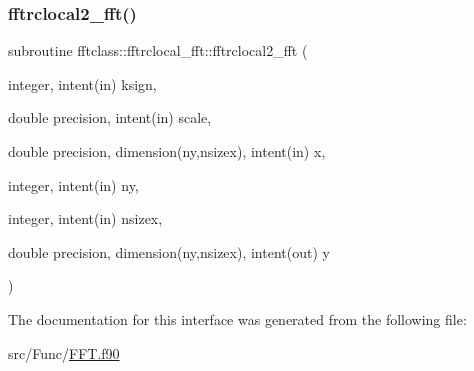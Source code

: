 \mbox{\label{interfacefftclass_1_1fftrclocal__fft_ab6b99a37c96bc0208402cced3fc85b5f}} 
\subsubsection{\texorpdfstring{fftrclocal2\_fft()}{fftrclocal2\_fft()}}
{\footnotesize\ttfamily subroutine fftclass\+::fftrclocal\+\_\+fft\+::fftrclocal2\+\_\+fft (\begin{DoxyParamCaption}\item[{integer, intent(in)}]{ksign,  }\item[{double precision, intent(in)}]{scale,  }\item[{double precision, dimension(ny,nsizex), intent(in)}]{x,  }\item[{integer, intent(in)}]{ny,  }\item[{integer, intent(in)}]{nsizex,  }\item[{double precision, dimension(ny,nsizex), intent(out)}]{y }\end{DoxyParamCaption})}



The documentation for this interface was generated from the following file\+:\begin{DoxyCompactItemize}
\item 
src/\+Func/\mbox{\hyperlink{_f_f_t_8f90}{F\+F\+T.\+f90}}\end{DoxyCompactItemize}
